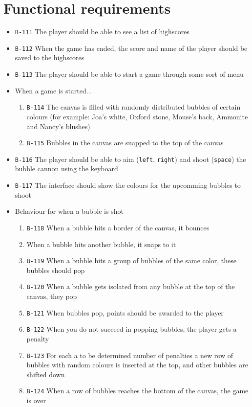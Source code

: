 \documentclass[a4paper]{article}
\begin{document}
\section{Functional requirements}
\begin{itemize}
  \item \texttt{B-111} The player should be able to see a list of highscores
  \item \texttt{B-112} When the game has ended, the score and name of the player should be saved to the highscores
  \item \texttt{B-113} The player should be able to start a game through some sort of menu

  \item When a game is started...
  \begin{enumerate}
    \item \texttt{B-114} The canvas is filled with randomly distributed bubbles of certain colours (for example: Joa's white, Oxford stone, Mouse's back, Ammonite and Nancy's blushes)
    \item \texttt{B-115} Bubbles in the canvas are snapped to the top of the canvas
  \end{enumerate}
  
  \item \texttt{B-116} The player should be able to aim (\texttt{left}, \texttt{right}) and shoot (\texttt{space}) the bubble cannon using the keyboard
  \item \texttt{B-117} The interface should show the colours for the upcomming bubbles to shoot
  \item Behaviour for when a bubble is shot
  \begin{enumerate}
    \item \texttt{B-118} When a bubble hits a border of the canvas, it bounces
    \item \texttt{} When a bubble hits another bubble, it snaps to it
    \item \texttt{B-119} When a bubble hits a group of bubbles of the same color, these bubbles should pop
    \item \texttt{B-120} When a bubble gets isolated from any bubble at the top of the canvas, they pop
    \item \texttt{B-121} When bubbles pop, points should be awarded to the player
    \item \texttt{B-122} When you do not succeed in popping bubbles, the player gets a penalty
    \item \texttt{B-123} For each a to be determined number of penalties a new row of bubbles with random colours is inserted at the top, and other bubbles are shifted down
    \item \texttt{B-124} When a row of bubbles reaches the bottom of the canvas, the game is over
  \end{enumerate}
  

\end{itemize}
\end{document}
